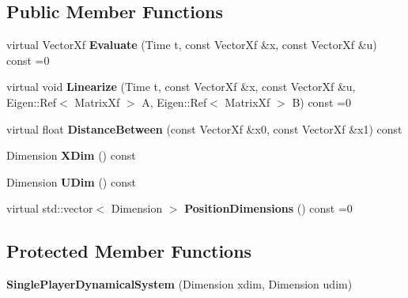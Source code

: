 \subsection*{Public Member Functions}
\begin{DoxyCompactItemize}
\item 
virtual Vector\+Xf {\bfseries Evaluate} (Time t, const Vector\+Xf \&x, const Vector\+Xf \&u) const =0\hypertarget{classilqgames_1_1_single_player_dynamical_system_a6a6fdd6eaf0fd0171d8f87a1648e3320}{}\label{classilqgames_1_1_single_player_dynamical_system_a6a6fdd6eaf0fd0171d8f87a1648e3320}

\item 
virtual void {\bfseries Linearize} (Time t, const Vector\+Xf \&x, const Vector\+Xf \&u, Eigen\+::\+Ref$<$ Matrix\+Xf $>$ A, Eigen\+::\+Ref$<$ Matrix\+Xf $>$ B) const =0\hypertarget{classilqgames_1_1_single_player_dynamical_system_a313d3d6403793169302a8163959cceca}{}\label{classilqgames_1_1_single_player_dynamical_system_a313d3d6403793169302a8163959cceca}

\item 
virtual float {\bfseries Distance\+Between} (const Vector\+Xf \&x0, const Vector\+Xf \&x1) const \hypertarget{classilqgames_1_1_single_player_dynamical_system_a2487c7603c1dc998799c0227d00904f3}{}\label{classilqgames_1_1_single_player_dynamical_system_a2487c7603c1dc998799c0227d00904f3}

\item 
Dimension {\bfseries X\+Dim} () const \hypertarget{classilqgames_1_1_single_player_dynamical_system_a54b50acd4d8eb613c5f1042e38a5f6fd}{}\label{classilqgames_1_1_single_player_dynamical_system_a54b50acd4d8eb613c5f1042e38a5f6fd}

\item 
Dimension {\bfseries U\+Dim} () const \hypertarget{classilqgames_1_1_single_player_dynamical_system_a24d4db1d3ad5450108eb22c412e606c1}{}\label{classilqgames_1_1_single_player_dynamical_system_a24d4db1d3ad5450108eb22c412e606c1}

\item 
virtual std\+::vector$<$ Dimension $>$ {\bfseries Position\+Dimensions} () const =0\hypertarget{classilqgames_1_1_single_player_dynamical_system_add0f6580940de79a76544496ec70d34a}{}\label{classilqgames_1_1_single_player_dynamical_system_add0f6580940de79a76544496ec70d34a}

\end{DoxyCompactItemize}
\subsection*{Protected Member Functions}
\begin{DoxyCompactItemize}
\item 
{\bfseries Single\+Player\+Dynamical\+System} (Dimension xdim, Dimension udim)\hypertarget{classilqgames_1_1_single_player_dynamical_system_aa83761473fdd007d641ff7a29e7c4fe1}{}\label{classilqgames_1_1_single_player_dynamical_system_aa83761473fdd007d641ff7a29e7c4fe1}

\end{DoxyCompactItemize}
